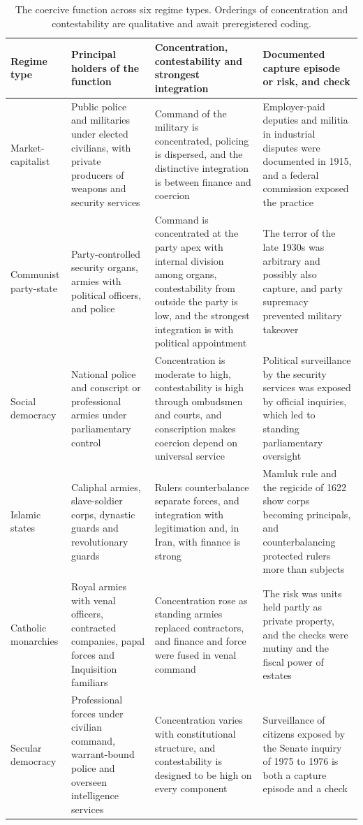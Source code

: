 \documentclass[11pt,letterpaper]{article}
\theoremstyle{definition}
\theoremstyle{remark}
\begin{document}
\begin{table}[!htbp]
\centering
\small
\caption{The coercive function across six regime types. Orderings of concentration and contestability are qualitative and await preregistered coding.}
\label{tab:regimes}
\renewcommand{\arraystretch}{1.15}
\begin{tabularx}{\textwidth}{@{}L{2.2cm}YYY@{}}
\toprule
Regime type & Principal holders of the function & Concentration, contestability and strongest integration & Documented capture episode or risk, and check \\
\midrule
Market-capitalist & Public police and militaries under elected civilians, with private producers of weapons and security services & Command of the military is concentrated, policing is dispersed, and the distinctive integration is between finance and coercion & Employer-paid deputies and militia in industrial disputes were documented in 1915, and a federal commission exposed the practice \\
Communist party-state & Party-controlled security organs, armies with political officers, and police & Command is concentrated at the party apex with internal division among organs, contestability from outside the party is low, and the strongest integration is with political appointment & The terror of the late 1930s was arbitrary and possibly also capture, and party supremacy prevented military takeover \\
Social democracy & National police and conscript or professional armies under parliamentary control & Concentration is moderate to high, contestability is high through ombudsmen and courts, and conscription makes coercion depend on universal service & Political surveillance by the security services was exposed by official inquiries, which led to standing parliamentary oversight \\
Islamic states & Caliphal armies, slave-soldier corps, dynastic guards and revolutionary guards & Rulers counterbalance separate forces, and integration with legitimation and, in Iran, with finance is strong & Mamluk rule and the regicide of 1622 show corps becoming principals, and counterbalancing protected rulers more than subjects \\
Catholic monarchies & Royal armies with venal officers, contracted companies, papal forces and Inquisition familiars & Concentration rose as standing armies replaced contractors, and finance and force were fused in venal command & The risk was units held partly as private property, and the checks were mutiny and the fiscal power of estates \\
Secular democracy & Professional forces under civilian command, warrant-bound police and overseen intelligence services & Concentration varies with constitutional structure, and contestability is designed to be high on every component & Surveillance of citizens exposed by the Senate inquiry of 1975 to 1976 is both a capture episode and a check \\
\bottomrule
\end{tabularx}
\end{table}
\end{document}

